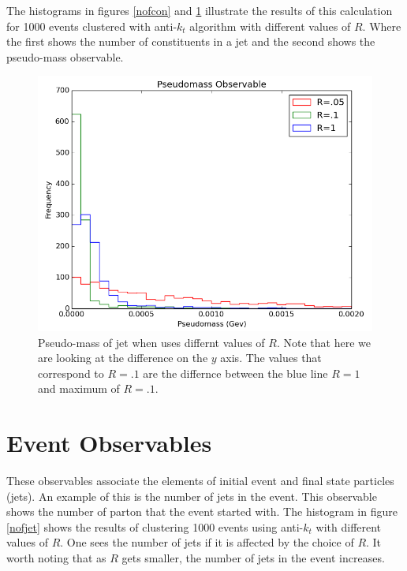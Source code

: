 The histograms in figures \ref{nofcon} and  \ref{pseudomass} illustrate the results of this calculation for 1000 events clustered with anti-$k_t$ algorithm with different values of $R$. Where the first shows the number of constituents in a jet and the second shows the pseudo-mass observable.
\begin{figure}[hbtp]
 \centering
 \includegraphics[scale=.7]{images/figure_13.png}
 \caption{Pseudo-mass of jet when uses differnt values of $R$.  Note that here we are looking at the difference on the $y$ axis. The values that correspond to $R = .1$ are the differnce between the blue line $R = 1$ and maximum of $R = .1$.}\label{pseudomass}
 \end{figure}
  


\section{Event Observables} 

These observables associate the elements of initial event and final state particles (jets). An example of this is the number of jets in the event. This observable shows the number of parton that the event started with. The histogram in figure \ref{nofjet} shows the results of clustering 1000 events using anti-$k_t$ with different values of $R$. One sees the number of jets if it is affected by the choice of $R$. It worth noting that as $R$ gets smaller, the number of jets in the event increases. 

